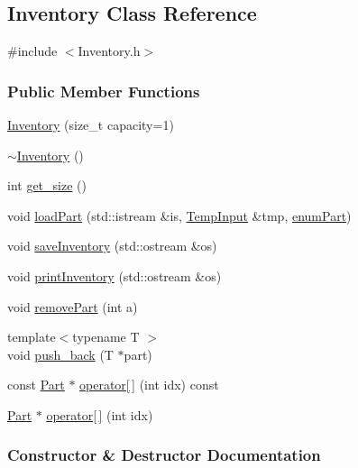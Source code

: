 \subsection{Inventory Class Reference}
\label{class_inventory}


{\ttfamily \#include $<$Inventory.\+h$>$}

\subsubsection*{Public Member Functions}
\begin{DoxyCompactItemize}
\item 
\mbox{\hyperlink{class_inventory_af2c8bea3c8fbf97fec4d3f5ffb92f347}{Inventory}} (size\+\_\+t capacity=1)
\item 
\mbox{\hyperlink{class_inventory_a6c6dfcb6d977c74a7abf46809e892e3d}{$\sim$\+Inventory}} ()
\item 
int \mbox{\hyperlink{class_inventory_a3ccacc9422b01b2c17836ca804bcaafc}{get\+\_\+size}} ()
\item 
void \mbox{\hyperlink{class_inventory_a9dd64f268a7a5cca611b5f749ec33f96}{load\+Part}} (std\+::istream \&is, \mbox{\hyperlink{struct_temp_input}{Temp\+Input}} \&tmp, \mbox{\hyperlink{_inventory_8h_abddff37837f171d72a2e16a1448a3943}{enum\+Part}})
\item 
void \mbox{\hyperlink{class_inventory_a084bafb32ed7dc4288fac96828c5302a}{save\+Inventory}} (std\+::ostream \&os)
\item 
void \mbox{\hyperlink{class_inventory_ad108e17923ce79c6ab0f9e04c2a6b6c2}{print\+Inventory}} (std\+::ostream \&os)
\item 
void \mbox{\hyperlink{class_inventory_a30f0fd3321c6cc606508684ce9d666ff}{remove\+Part}} (int a)
\item 
{\footnotesize template$<$typename T $>$ }\\void \mbox{\hyperlink{class_inventory_a90cb96a50ebc28f0de4a009004e9b192}{push\+\_\+back}} (T $\ast$part)
\item 
const \mbox{\hyperlink{class_part}{Part}} $\ast$ \mbox{\hyperlink{class_inventory_a99b8be25beb3530c47d1faa913633979}{operator\mbox{[}$\,$\mbox{]}}} (int idx) const
\item 
\mbox{\hyperlink{class_part}{Part}} $\ast$ \mbox{\hyperlink{class_inventory_a86601b8ee999e78cdeea83431bab8f33}{operator\mbox{[}$\,$\mbox{]}}} (int idx)
\end{DoxyCompactItemize}


\subsubsection{Constructor \& Destructor Documentation}
\mbox{\label{class_inventory_af2c8bea3c8fbf97fec4d3f5ffb92f347}} 
